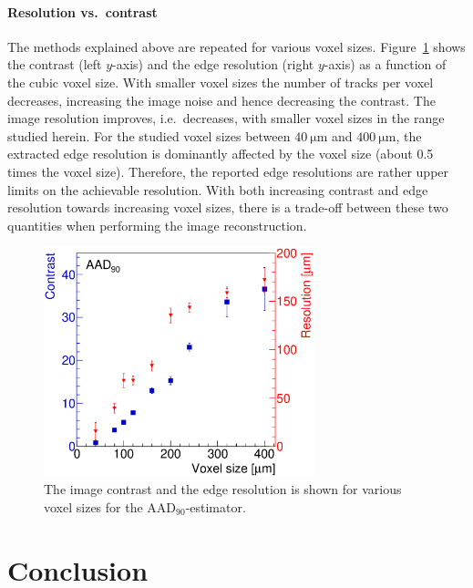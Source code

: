 \documentclass{PoS}
\newcommand{\aadninety}{\ensuremath{\textrm{AAD}_\textrm{90}}}
\begin{document}
\paragraph{Resolution vs.\ contrast}

The methods explained above are repeated for various voxel sizes. 
Figure~\ref{fig:resovscontrast} shows the contrast (left $y$-axis) and the edge resolution (right $y$-axis) as a function of the cubic voxel size.
With smaller voxel sizes the number of tracks per voxel decreases, increasing the image noise and hence decreasing the contrast.
The image resolution improves, i.e.\ decreases, with smaller voxel sizes in the range studied herein. 
For the studied voxel sizes between $\SI{40}{\um}$ and $\SI{400}{\um}$, the extracted edge resolution is dominantly affected by the voxel size (about 0.5 times the voxel size). 
Therefore, the reported edge resolutions are rather upper limits on the achievable resolution. 
With both increasing contrast and edge resolution towards increasing voxel sizes, there is a trade-off between these two quantities when performing the image reconstruction. 


\begin{figure}[t!]
  \centering
  \includegraphics[width=0.70\textwidth]{figures/CRvsVS.eps}
    \caption[contrast]{%
    The image contrast and the edge resolution is shown for various voxel sizes for the $\aadninety$-estimator.}
  \label{fig:resovscontrast}
\end{figure}





\section{Conclusion}
\end{document}
